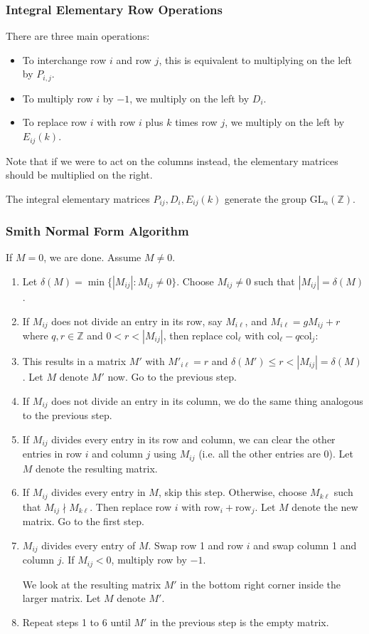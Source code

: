 \documentclass{article}
\begin{document}
\subsubsection{Integral Elementary Row Operations}
There are three main operations:
\begin{itemize}
    \item To interchange row $i$ and row $j$, this is equivalent to multiplying on the left by $P_{i,j}$.
    \item To multiply row $i$ by $-1$, we multiply on the left by $D_i$.
    \item To replace row $i$ with row $i$ plus $k$ times row $j$, we multiply on the left by $E_{ij}(k)$.
\end{itemize}
Note that if we were to act on the columns instead, the elementary matrices should be multiplied on the right.
\begin{idea}
    The integral elementary matrices $P_{ij},D_i,E_{ij}(k)$ generate the group $\text{GL}_n(\mathbb{Z})$.
\end{idea}
\subsubsection{Smith Normal Form Algorithm}
If $M=0$, we are done. Assume $M \neq 0$.
\begin{enumerate}
    \item Let $\delta(M) = \min\{|M_{ij}| : M_{ij} \neq 0\}$. Choose $M_{ij} \neq 0$ such that $|M_{ij}|=\delta(M)$.
    \item If $M_{ij}$ does not divide an entry in its row, say $M_{i\ell}$, and $M_{i\ell}=gM_{ij}+r$ where $q,r \in \mathbb{Z}$ and $0<r<|M_{ij}|$, then replace $\text{col}_{\ell}$ with $\text{col}_{\ell}-q\text{col}_{j}$:
    \item This results in a matrix $M'$ with $M'_{i\ell}=r$ and $\delta(M') \le r < |M_{ij}| = \delta(M)$. Let $M$ denote $M'$ now. Go to the previous step.
    \item If $M_{ij}$ does not divide an entry in its column, we do the same thing analogous to the previous step.
    \item If $M_{ij}$ divides every entry in its row and column, we can clear the other entries in row $i$ and column $j$ using $M_{ij}$ (i.e. all the other entries are $0$). Let $M$ denote the resulting matrix.
    \item If $M_{ij}$ divides every entry in $M$, skip this step. Otherwise, choose $M_{k\ell}$ such that $M_{ij} \nmid M_{k\ell}.$ Then replace row $i$ with $\text{row}_i+\text{row}_j$. Let $M$ denote the new matrix. Go to the first step.
    \item $M_{ij}$ divides every entry of $M$. Swap row 1 and row $i$ and swap column 1 and column $j$. If $M_{ij} < 0$, multiply row by $-1$.

          We look at the resulting matrix $M'$ in the bottom right corner inside the larger matrix. Let $M$ denote $M'$.
    \item Repeat steps 1 to 6 until $M'$ in the previous step is the empty matrix.
\end{enumerate}
\end{document}
